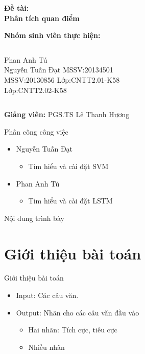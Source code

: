 \documentclass[compress]{beamer}
\author{Nguyễn Tuấn Đạt, Phan Anh Tú (SoICT-HUST)}
\begin{document}
 
\begin{frame}
\begin{center}
\huge \bf Đề tài:\\ Phân tích quan điểm
\end{center}
\vspace{0.7cm}
\textbf{Nhóm sinh viên thực hiện:}\\[0.1cm]
\begin{columns}
Phan Anh Tú\\ 
Nguyễn Tuấn Đạt 
MSSV:20134501\\
MSSV:20130856
Lớp:CNTT2.01-K58\\
Lớp:CNTT2.02-K58
\end{columns}
\vspace{1cm}
\textbf{Giảng viên:} PGS.TS Lê Thanh Hương
\end{frame} 

\begin{frame}{Phân công công việc}
\begin{itemize}
\item Nguyễn Tuấn Đạt
\begin{itemize}
\item Tìm hiểu và cài đặt SVM
\end{itemize}
\item Phan Anh Tú
\begin{itemize}
\item Tìm hiểu và cài đặt LSTM
\end{itemize}
\end{itemize}
\end{frame}
  
   
\begin{frame}{Nội dung trình bày}
\tableofcontents
\end{frame}

\section{Giới thiệu bài toán}
\begin{frame}{Giới thiệu bài toán}
\begin{itemize}
\item Input: Các câu văn.
\item Output: Nhãn cho các câu văn đầu vào
\begin{itemize}
\item Hai nhãn: Tích cực, tiêu cực
\item Nhiều nhãn
\end{itemize}
\end{itemize}
\end{frame}
\end{document}

